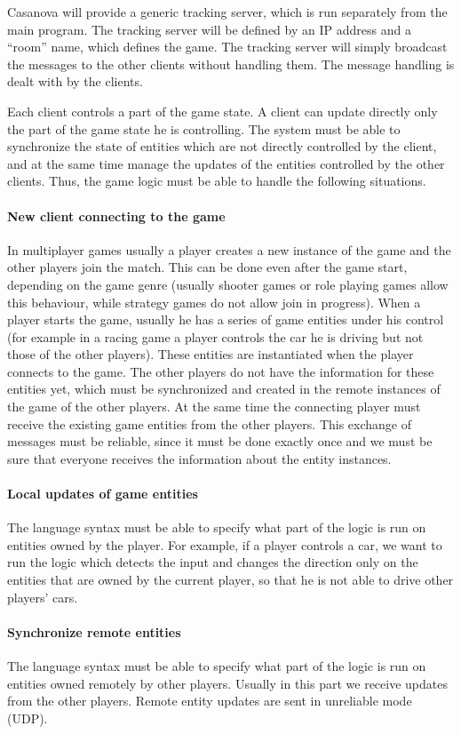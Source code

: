 Casanova will provide a generic tracking server, which is run separately from the main program. The tracking server will be defined by an IP address and a ``room'' name, which defines the game. The tracking server will simply broadcast the messages to the other clients without handling them. The message handling is dealt with by the clients.

Each client controls a part of the game state. A client can update directly only the part of the game state he is controlling. The system must be able to synchronize the state of entities which are not directly controlled by the client, and at the same time manage the updates of the entities controlled by the other clients. Thus, the game logic must be able to handle the following situations.

\paragraph*{New client connecting to the game} 
In multiplayer games usually a player creates a new instance of the game and the other players join the match. This can be done even after the game start, depending on the game genre (usually shooter games or role playing games allow this behaviour, while strategy games do not allow join in progress). When a player starts the game, usually he has a series of game entities under his control (for example in a racing game a player controls the car he is driving but not those of the other players). These entities are instantiated when the player connects to the game. The other players do not have the information for these entities yet, which must be synchronized and created in the remote instances of the game of the other players. At the same time the connecting player must receive the existing game entities from the other players. This exchange of messages must be reliable, since it must be done exactly once and we must be sure that everyone receives the information about the entity instances.
\paragraph*{Local updates of game entities}
The language syntax must be able to specify what part of the logic is run on entities owned by the player. For example, if a player controls a car, we want to run the logic which detects the input and changes the direction only on the entities that are owned by the current player, so that he is not able to drive other players' cars.
\paragraph*{Synchronize remote entities}
The language syntax must be able to specify what part of the logic is run on entities owned remotely by other players. Usually in this part we receive updates from the other players. Remote entity updates are sent in unreliable mode (UDP).

